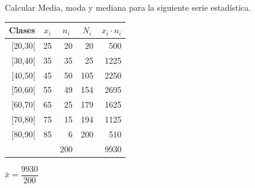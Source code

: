 \vspace{5mm}%
\begin{ejemplo}
	
\begin{ejre}

Calcular Media, moda y mediana para la siguiente serie estadística.

\begin{multicols}{2}
\begin{footnotesize}
\begin{table}[H]
\small
\centering
\begin{tabular}{rr|r|r|r}
\hline
\multicolumn{1}{|c|}{\textbf{Clases}} & \multicolumn{1}{c|}{\textbf{$x_i$}} & \multicolumn{1}{c|}{\textbf{$n_i$}} & \multicolumn{1}{c|}{\textbf{$N_i$}} & \multicolumn{1}{c|}{\textbf{$x_i\cdot n_i$}} \\ \hline
\multicolumn{1}{r|}{[20,30[}          & 25                                  & 20                                  & 20                                  & 500                                          \\
\multicolumn{1}{r|}{[30,40[}          & 35                                  & 35                                  & 25                                  & 1225                                         \\
\multicolumn{1}{r|}{[40,50[}          & 45                                  & 50                                  & 105                                 & 2250                                         \\
\multicolumn{1}{r|}{[50,60[}          & 55                                  & 49                                  & 154                                 & 2695                                         \\
\multicolumn{1}{r|}{[60,70[}          & 65                                  & 25                                  & 179                                 & 1625                                         \\
\multicolumn{1}{r|}{[70,80[}          & 75                                  & 15                                  & 194                                 & 1125                                         \\
\multicolumn{1}{r|}{[80,90[}          & 85                                  & 6                                   & 200                                 & 510                                          \\ \cline{3-3} \cline{5-5} 
                                      &                                     & 200                                 &                                     & \multicolumn{1}{r|}{9930}                    \\ \cline{3-3} \cline{5-5} 
\end{tabular}
\end{table}
\end{footnotesize}
\hspace{1cm} \begin{footnotesize}$\bar{x}=\dfrac{9930}{200}$\end{footnotesize}


\end{multicols}
\end{ejre}
\end{ejemplo}
